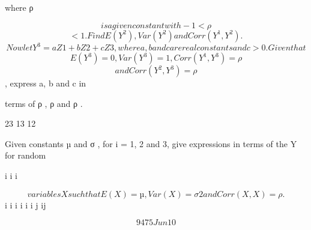 \documentclass[12pt]{article}
\begin{document}
\begin{flushleft}
where ρ\par
\[is a given constant with -1 < ρ\]
\[< 1. Find E(Y^2), Var (Y^2) and Corr(Y^1, Y^2).\]
\[Now let Y^3 = aZ1 + bZ2 + cZ3, where a, b and c are real constants and c > 0. Given that\]
\[E(Y^3) = 0, Var (Y^3) = 1, Corr(Y^1, Y^3) = ρ\]
\[and Corr(Y^2, Y^3) = ρ\]
, express a, b and c in\par
terms of ρ , ρ and ρ .\par
23 13 12\par
Given constants µ and σ , for i = 1, 2 and 3, give expressions in terms of the Y for random\par
i i i\par
\[variables X such that E(X ) = µ , Var (X ) = σ2 and Corr(X , X ) = ρ .\]
i i i i i i j ij\par
\[9475 Jun10\]
\end{flushleft}
\end{document}
